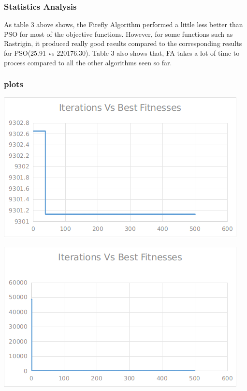 \documentclass[12pt]{article}
\begin{document}
				\subsubsection{Statistics Analysis}
				
					As table 3 above shows, the Firefly Algorithm performed a little less better than PSO for most of the objective functions. However, for some functions such as Rastrigin, it produced really good results compared to the corresponding results for PSO(25.91 vs 220176.30). Table 3 also shows that, FA takes a lot of time to process compared to all the other algorithms seen so far.
				\subsubsection{plots}
				
					\begin{minipage}{0.6\linewidth}
						\includegraphics[width=\linewidth]{19.png}
					\end{minipage}
					\hfill
					\begin{minipage}{0.6\linewidth}
						\includegraphics[width=\linewidth]{20.png}
					\end{minipage}
\end{document}
